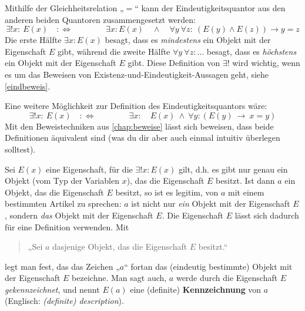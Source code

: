 \begin{bem} \label{eindquantzerlegung}
    Mithilfe der Gleichheitsrelation „$=$“ kann der Eindeutigkeitsquantor aus den anderen beiden Quantoren zusammengesetzt werden:
        \[ \exists ! x:\ E(x)\quad :\Leftrightarrow\qquad\qquad \exists x: E(x) \quad \land\quad \forall y\ \forall z:\ (E(y)\land E(z)) \to y=z \]
    Die erste Hälfte $\exists x: E(x)$ besagt, dass es \emph{mindestens} ein Objekt mit der Eigenschaft $E$ gibt, während die zweite Hälfte $\forall y\ \forall z:\dots$ besagt, dass es \emph{höchstens} ein Objekt mit der Eigenschaft $E$ gibt. Diese Definition von $\exists!$ wird wichtig, wenn es um das Beweisen von Existenz-und-Eindeutigkeit-Aussagen geht, siehe \cref{eindbeweis}.

    Eine weitere Möglichkeit zur Definition des Eindeutigkeitsquantors wäre:
        \[ \exists ! x:\ E(x)\quad :\Leftrightarrow\qquad\qquad \exists x:\quad E(x)\ \land\ \forall y: (E(y)\ \to\ x=y) \]
    Mit den Beweistechniken aus \cref{chap:beweise} lässt sich beweisen, dass beide Definitionen äquivalent sind (was du dir aber auch einmal intuitiv überlegen solltest).
\end{bem}


\begin{nota} \label{kennzeichnung} 
    Sei $E(x)$ eine Eigenschaft, für die $\exists ! x: E(x)$ gilt, d.h. es gibt nur genau ein Objekt (vom Typ der Variablen $x$), das die Eigenschaft $E$ besitzt. Ist dann $a$ ein Objekt, das die Eigenschaft $E$ besitzt, so ist es legitim, von $a$ mit einem bestimmten Artikel zu sprechen: $a$ ist nicht nur \emph{ein} Objekt mit der Eigenschaft $E$, sondern \emph{das} Objekt mit der Eigenschaft $E$. Die Eigenschaft $E$ lässt sich dadurch für eine Definition verwenden. Mit
    \begin{quote}
        „Sei $a$ dasjenige Objekt, das die Eigenschaft $E$ besitzt.“
    \end{quote}
    legt man fest, das das Zeichen „$a$“ fortan das (eindeutig bestimmte) Objekt mit der Eigenschaft $E$ bezeichne. Man sagt auch, $a$ werde durch die Eigenschaft $E$ \emph{gekennzeichnet}, und nennt $E(a)$ eine (definite) \textbf{Kennzeichnung} von $a$ (Englisch: \emph{(definite) description}).
\end{nota}



